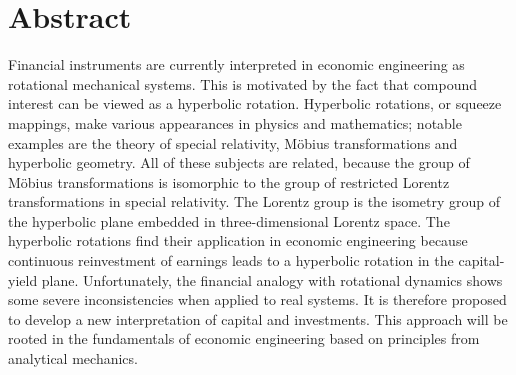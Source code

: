 \chapter*{Abstract}%
Financial instruments are currently interpreted in economic engineering as rotational mechanical systems. This is motivated by the fact that compound interest can be viewed as a hyperbolic rotation. Hyperbolic rotations, or squeeze mappings, make various appearances in physics and mathematics; notable examples are the theory of special relativity, Möbius transformations and hyperbolic geometry. All of these subjects are related, because the group of Möbius transformations is isomorphic to the group of restricted Lorentz transformations in special relativity. The Lorentz group is the isometry group of the hyperbolic plane embedded in three-dimensional Lorentz space. The hyperbolic rotations find their application in economic engineering because continuous reinvestment of earnings leads to a hyperbolic rotation in the capital-yield plane. Unfortunately, the financial analogy with rotational dynamics shows some severe inconsistencies when applied to real systems. It is therefore proposed to develop a new interpretation of capital and investments. This approach will be rooted in the fundamentals of economic engineering based on principles from analytical mechanics.





